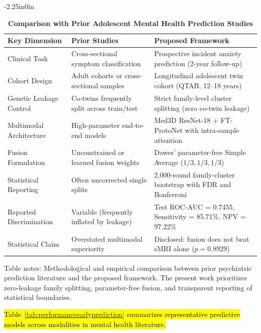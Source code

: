 \documentclass[10pt,letterpaper]{article}
\begin{document}
\begin{table}[!t]
\begin{adjustwidth}{-2.25in}{0in}
\centering
\caption{\textbf{Comparison with Prior Adolescent Mental Health Prediction Studies}}
\label{tab:prior_comparison}
\footnotesize
\renewcommand{\arraystretch}{1.15}
\begin{tabular}{|p{4.5cm}|p{5.5cm}|p{6.0cm}|}
\hline
\textbf{Key Dimension} & \textbf{Prior Studies} & \textbf{Proposed Framework} \\
\hline
Clinical Task & Cross-sectional symptom classification & Prospective incident anxiety prediction (2-year follow-up) \\
\hline
Cohort Design & Adult cohorts or cross-sectional samples & Longitudinal adolescent twin cohort (QTAB, 12--18 years) \\
\hline
Genetic Leakage Control & Co-twins frequently split across train/test & Strict family-level cluster splitting (zero co-twin leakage) \\
\hline
Multimodal Architecture & High-parameter end-to-end models & Med3D ResNet-18 + FT-ProtoNet with intra-sample attention \\
\hline
Fusion Formulation & Unconstrained or learned fusion weights & Dawes' parameter-free Simple Average ($1/3, 1/3, 1/3$) \\
\hline
Statistical Reporting & Often uncorrected single splits & 2,000-round family-cluster bootstrap with FDR and Bonferroni \\
\hline
Reported Discrimination & Variable (frequently inflated by leakage) & Test ROC-AUC = 0.7455, Sensitivity = 85.71\%, NPV = 97.22\% \\
\hline
Statistical Claim & Overstated multimodal superiority & Disclosed: fusion does not beat sMRI alone ($p = 0.8929$) \\
\hline
\end{tabular}
\begin{flushleft}
Table notes: Methodological and empirical comparison between prior psychiatric prediction literature and the proposed framework. The present work prioritizes zero-leakage family splitting, parameter-free fusion, and transparent reporting of statistical boundaries.
\end{flushleft}
\end{adjustwidth}
\end{table}

\hl{Table~\ref{tab:performanceearlyprediction} summarizes representative predictive models across modalities in mental health literature.}
\end{document}
